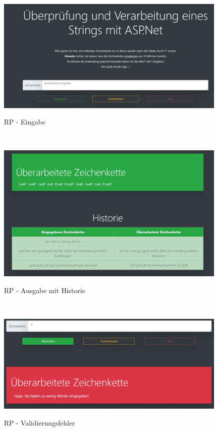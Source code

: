 \documentclass[a4paper,
12pt,
oneside]
{article}
\begin{document}
	\begin{figure}[h]
		\centering
		\caption{RP - Eingabe}
		\includegraphics[width=1\textwidth]{img/rp_form.jpg} \\
		\label{fig:input}
	\end{figure} \\
	\begin{figure}[h]
		\centering
		\caption{RP - Ausgabe mit Historie}
		\includegraphics[width=1\textwidth]{img/rp-output.jpg} \\
		\label{fig:ouput}
	\end{figure} \\
	\begin{figure}[h]
		\centering
		\caption{RP - Validierungsfehler}
		\includegraphics[width=1\textwidth]{img/error.jpg} \\
		\label{fig:error}
	\end{figure} \\
\end{document}
